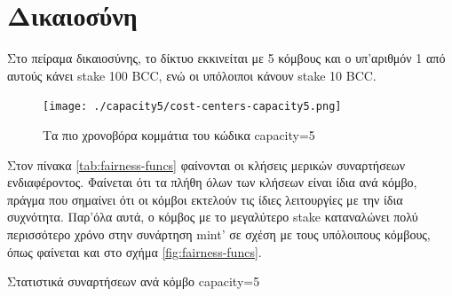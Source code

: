 \documentclass{article}
\newcommand{\eng}[1]{\foreignlanguage{english}{#1}} %
\begin{document}
%             


\clearpage
\section{Δικαιοσύνη}

Στο πείραμα δικαιοσύνης, το δίκτυο εκκινείται με 5 κόμβους και ο υπ'αριθμόν 1
από αυτούς κάνει \eng{stake 100 BCC}, ενώ οι υπόλοιποι κάνουν \eng{stake 10 BCC}.

\graphicspath{{../experiments/profiled\_outputs/docker/fairness/}}
\begin{figure}[ht]
    \centering
    \texttt{[image: ./capacity5/cost-centers-capacity5.png]}
    \caption{Τα πιο χρονοβόρα κομμάτια του κώδικα \eng{capacity=5}}
    \label{fig:fairness-cost-centers}
\end{figure}

Στον πίνακα \ref{tab:fairness-funcs} φαίνονται οι κλήσεις μερικών συναρτήσεων
ενδιαφέροντος. Φαίνεται ότι τα πλήθη όλων των κλήσεων είναι ίδια ανά κόμβο,
πράγμα που σημαίνει ότι οι κόμβοι εκτελούν τις ίδιες λειτουργίες με την ίδια
συχνότητα. Παρ'όλα αυτά, ο κόμβος με το μεγαλύτερο \eng{stake} καταναλώνει πολύ
περισσότερο χρόνο στην συνάρτηση \eng{mint'} σε σχέση με τους υπόλοιπους
κόμβους, όπως φαίνεται και στο σχήμα \ref{fig:fairness-funcs}.

\begin{table}[ht]
    \centering
    \caption{Στατιστικά συναρτήσεων ανά κόμβο \eng{capacity=5}}
    \label{tab:fairness-funcs}
\end{table}
\end{document}
